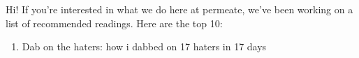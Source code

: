 Hi! If you're interested in what we do here at permeate, we've been working on a list of recommended readings. Here are the top 10:

\begin{enumerate}
	\item Dab on the haters: how i dabbed on 17 haters in 17 days
\end{enumerate}